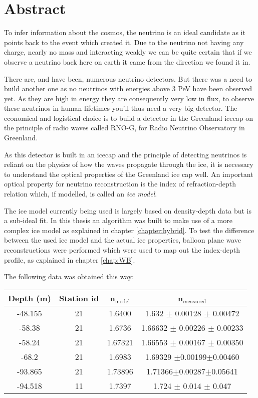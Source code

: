 \chapter*{Abstract}
To infer information about the cosmos, the neutrino is an ideal candidate as it
points back to the event which created it.  Due to the neutrino not having any charge,
nearly no mass and interacting weakly we can be quite certain that if we
observe a neutrino back here on earth it came from the direction we found it in.

There are, and have been, numerous neutrino detectors. But there was a need to
build another one as no neutrinos with energies above 3 PeV have been
observed yet. As they are high in energy they are consequently very low in flux, to
observe these neutrinos in human lifetimes you'll thus need a very big
detector.  The economical and logistical choice is to build a detector in the
Greenland icecap on the principle of radio waves called RNO-G, for
Radio Neutrino Observatory in Greenland.

As this detector is built in an icecap and the principle of detecting neutrinos is reliant
on the physics of how the waves propagate through the ice, it is necessary to understand 
the optical properties of the Greenland ice cap well. An important optical property
for neutrino reconstruction is the index of refraction-depth relation which, if modelled,
is called an \textit{ice model}.

The ice model currently being used is largely based on density-depth data but is 
a sub-ideal fit. In this thesis an algorithm was built to make use of a more complex
ice model as explained in chapter \ref{chapter:hybrid}. To test the difference between the
used ice model and the actual ice properties, balloon plane wave reconstructions were
performed which were used to map out the index-depth profile, as explained in chapter \ref{chap:WB}.

The following data was obtained this way:
\begin{center}
\begin{tabular}{||c c c c||}
 \hline
 Depth (m) & Station id & n$_\text{model}$ & n$_\text{measured}$\\ [0.5ex]
 \hline\hline
 -48.155 & 21 & 1.6400 & 1.632 $\pm$ 0.00128 $\pm$ 0.00472\\
 -58.38 & 21 & 1.6736 & 1.66632 $\pm$ 0.00226 $\pm$ 0.00233 \\
 -58.24 & 21 & 1.67321 & 1.66553 $\pm$ 0.00167 $\pm$ 0.00350 \\
 -68.2 & 21 & 1.6983 & 1.69329 $\pm$0.00199$\pm$0.00460 \\
 -93.865 & 21 & 1.73896 & 1.71366$\pm$0.00287$\pm$0.05641\\
 -94.518 & 11 & 1.7397 & 1.724 $\pm$ 0.014 $\pm$ 0.047 \\
 \hline
\end{tabular}
\end{center}
\newpage
